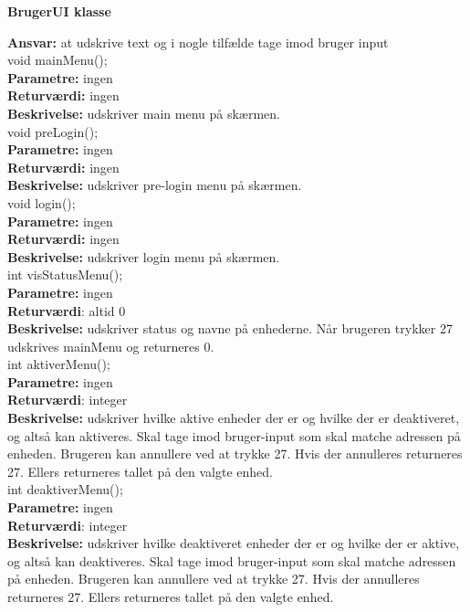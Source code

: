 \newpage

{\centering 
\textbf{BrugerUI klasse}\par
}
\textbf{Ansvar:} at udskrive text og i nogle tilfælde tage imod bruger input \\

void mainMenu(); \\
\textbf{Parametre:} ingen \\
\textbf{Returværdi:} ingen \\
\textbf{Beskrivelse:} udskriver main menu på skærmen. \\

void preLogin(); \\
\textbf{Parametre:} ingen \\
\textbf{Returværdi:} ingen \\
\textbf{Beskrivelse:} udskriver pre-login menu på skærmen. \\

void login(); \\
\textbf{Parametre:} ingen \\
\textbf{Returværdi:} ingen \\
\textbf{Beskrivelse:} udskriver login menu på skærmen. \\

int visStatusMenu(); \\
\textbf{Parametre:} ingen \\
\textbf{Returværdi}: altid 0 \\
\textbf{Beskrivelse:} udskriver status og navne på enhederne. Når brugeren trykker 27 udskrives mainMenu og returneres 0. \\

int aktiverMenu(); \\
\textbf{Parametre:} ingen \\
\textbf{Returværdi}: integer \\
\textbf{Beskrivelse:} udskriver hvilke aktive enheder der er og hvilke der er deaktiveret, og altså kan aktiveres. Skal tage imod bruger-input som skal matche adressen på enheden. Brugeren kan annullere ved at trykke 27. Hvis der annulleres returneres 27. Ellers returneres tallet på den valgte enhed. \\

int deaktiverMenu(); \\
\textbf{Parametre:} ingen \\
\textbf{Returværdi}: integer \\
\textbf{Beskrivelse:} udskriver hvilke deaktiveret enheder der er og hvilke der er aktive, og altså kan deaktiveres. Skal tage imod bruger-input som skal matche adressen på enheden. Brugeren kan annullere ved at trykke 27. Hvis der annulleres returneres 27. Ellers returneres tallet på den valgte enhed. \\

